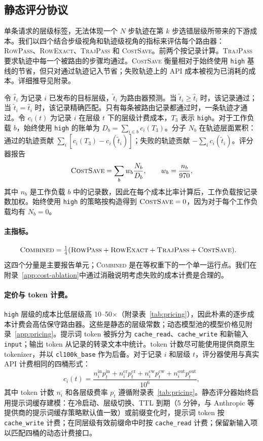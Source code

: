 \subsection{静态评分协议}
\label{sec:static-scoring}

单条请求的层级标签，无法体现一个 $N$ 步轨迹在第 $k$ 步选错层级所带来的下游成本。我们以四个结合步级视角和轨迹级视角的指标来评估每个路由器：\textsc{RowPass}、\textsc{RowExact}、\textsc{TrajPass} 和 \textsc{CostSave}。前两个按记录计算。\textsc{TrajPass} 要求轨迹中每一个被路由的步骤均通过。\textsc{CostSave} 衡量相对于始终使用 \texttt{high} 基线的节省，但只对通过轨迹记入节省；失败轨迹上的 API 成本被视为已消耗的成本。详细推导见附录。

令 $\hat{t}_i$ 为记录 $i$ 已发布的目标层级，$\tilde{t}_i$ 为路由器预测。当 $\tilde{t}_i \ge \hat{t}_i$ 时，该记录通过；当 $\tilde{t}_i=\hat{t}_i$ 时，该记录精确匹配。只有每条被路由记录都通过时，一条轨迹才通过。令 $c_i(t)$ 为记录 $i$ 在层级 $t$ 下的层级计费成本，$T_3$ 表示 \texttt{high}。对于工作负载 $b$，始终使用 \texttt{high} 的账单为 $D_b=\sum_{i\in b} c_i(T_3)$。分子 $N_b$ 在轨迹层面累积：通过的轨迹贡献 $\sum_i[c_i(T_3)-c_i(\tilde{t}_i)]$；失败的轨迹贡献 $-\sum_i c_i(\tilde{t}_i)$。评分器报告
\[
\textsc{CostSave} = \sum_b w_b \frac{N_b}{D_b}, \qquad
w_b = \frac{n_b}{970},
\]
其中 $n_b$ 是工作负载 $b$ 中的记录数，因此在每个成本比率计算后，工作负载按记录数加权。始终使用 \texttt{high} 的策略按构造得到 $\textsc{CostSave}=0$，因为对于每个工作负载均有 $N_b=0$。

\paragraph{主指标。}
\[
\begin{aligned}
\textsc{Combined} = \tfrac{1}{4}(&\textsc{RowPass} +
\textsc{RowExact} + \textsc{TrajPass} + \textsc{CostSave}).
\end{aligned}
\]
这四个分量是主要报告单元；\textsc{Combined} 是在等权重下的一个单一运行点。我们在附录~\ref{app:cost-ablation}中通过消融说明考虑失败的成本计费是合理的。

\paragraph{定价与 token 计费。}
\texttt{high} 层级的成本比低层级高 10--50$\times$（附录表~\ref{tab:pricing}），因此朴素的逐步成本计费会高估保守路由器。这些是静态的层级常数；动态模型池的模型价格见附录~\ref{app:pricing}。提示词 token 被拆分为 \texttt{cache\_read}、\texttt{cache\_write} 和新输入 \texttt{input}；输出 token 从记录的转录文本中统计。token 计数尽可能使用提供商原生 tokenizer，并以 \texttt{cl100k\_base} 作为后备。对于记录 $i$ 和层级 $t$，评分器使用与真实 API 计费相同的四桶形式：
\[
c_i(t)=
\frac{
n_i^{\mathrm{in}}p_t^{\mathrm{in}}+
n_i^{\mathrm{cr}}p_t^{\mathrm{cr}}+
n_i^{\mathrm{cw}}p_t^{\mathrm{cw}}+
n_i^{\mathrm{out}}p_t^{\mathrm{out}}
}{10^6},
\]
其中 token 计数 $n_i^{\cdot}$ 和各层级费率 $p_t^{\cdot}$ 遵循附录表~\ref{tab:pricing}。静态评分器始终启用提示词缓存建模：在冷启动、层级切换、TTL 到期（5 分钟，与 Anthropic 等提供商的提示词缓存策略默认值一致）或前缀变化时，提示词 token 按 \texttt{cache\_write} 计费；在同层级有效前缀命中时按 \texttt{cache\_read} 计费；保留新输入项以匹配四桶的动态计费接口。

